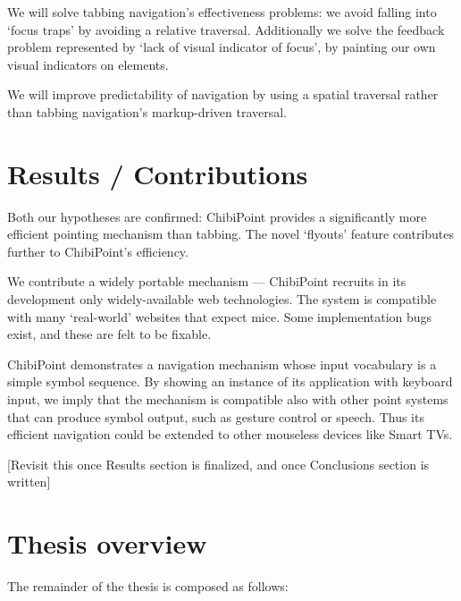 \documentclass[a4paper, 12pt]{report}
\begin{document}
We will solve tabbing navigation's effectiveness problems: we avoid falling into `focus traps' by avoiding a relative traversal.
Additionally we solve the feedback problem represented by `lack of visual indicator of focus', by painting our own visual indicators on elements.

We will improve predictability of navigation by using a spatial traversal rather than tabbing navigation's markup-driven traversal.

\section{Results / Contributions}
Both our hypotheses are confirmed: ChibiPoint provides a significantly more efficient pointing mechanism than tabbing. The novel `flyouts' feature contributes further to ChibiPoint's efficiency.

We contribute a widely portable mechanism --- ChibiPoint recruits in its development only widely-available web technologies. The system is compatible with many `real-world' websites that expect mice. Some implementation bugs exist, and these are felt to be fixable.

ChibiPoint demonstrates a navigation mechanism whose input vocabulary is a simple symbol sequence. By showing an instance of its application with keyboard input, we imply that the mechanism is compatible also with other point systems that can produce symbol output, such as gesture control or speech. Thus its efficient navigation could be extended to other mouseless devices like Smart TVs.

[Revisit this once Results section is finalized, and once Conclusions section is written]
\section{Thesis overview}
\newcommand{\chapterref}[2]{\Cref{#1}, \textit{#2},}
The remainder of the thesis is composed as follows:
\end{document}
